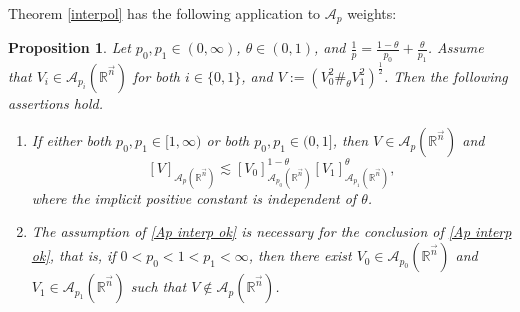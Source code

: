 \documentclass[11pt, reqno]{amsart}
\newtheorem{proposition}[theorem]{Proposition}
\theoremstyle{definition}
\theoremstyle{remark}
\numberwithin{equation}{section}
\newcommand{\A}{\mathscr A}
\newcommand{\R}{\mathbb R}
\newcommand{\vn}{\vec n}
\begin{document}
Theorem \ref{interpol} has the following application to $\A_p$ weights:

\begin{proposition}\label{Ap interp}
Let $p_0,p_1\in(0,\infty)$, $\theta\in(0,1)$, and $\frac1p=\frac{1-\theta}{p_0}+\frac{\theta}{p_1}$.
Assume that $V_i\in\A_{p_i}(\R^{\vn})$ for both $i\in\{0,1\}$,
and $V:=(V_0^2\#_\theta V_1^2)^{\frac12}$.
Then the following assertions hold.
\begin{enumerate}[\rm(i)]
\item\label{Ap interp ok}
If either both $p_0,p_1\in[1,\infty)$ or
both $p_0,p_1\in(0,1]$, then $V\in\A_p(\R^{\vn})$ and
$$
[V]_{\A_p(\R^{\vn})}\lesssim[V_0]_{\A_{p_0}(\R^{\vn})}^{1-\theta}[V_1]_{\A_{p_1}(\R^{\vn})}^\theta,
$$
where the implicit positive constant is independent of $\theta$.

\item\label{Ap interp fails}
The assumption of \eqref{Ap interp ok} is necessary for the conclusion of \eqref{Ap interp ok},
that is, if $0<p_0<1<p_1<\infty$, then there exist
$V_0\in\A_{p_0}(\R^{\vn})$ and $V_1\in\A_{p_1}(\R^{\vn})$
such that $V\notin\A_p(\R^{\vn})$.
\end{enumerate}
\end{proposition}
\end{document}
